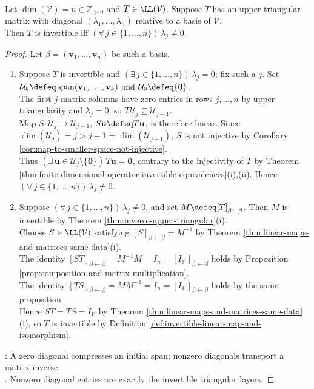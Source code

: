 \begin{proposition} \label{prop:upper-triangular-invertibility-criterion} \\
Let $\dim(\mathcal{V})=n\in\mathbb{Z}_{>0}$ and $T\in\LL(\mathcal{V})$. Suppose $T$ has an upper-triangular matrix with diagonal $(\lambda_1,\ldots,\lambda_n)$ relative to a basis of $\mathcal{V}$.\\
Then $T$ is invertible iff $(\forall\,j\in\{1,\ldots,n\})\,\lambda_j\neq0$.
\begin{proof}
Let $\beta=(\mathbf{v}_1,\ldots,\mathbf{v}_n)$ be such a basis.
\begin{enumerate}[label=\roman*.]
\setlength{\itemsep}{0pt}
\item[$(\Rightarrow)$] Suppose $T$ is invertible and $(\exists\,j\in\{1,\ldots,n\})\,\lambda_j=0$; fix such a $j$. Set $\mathcal{U}_k\defeq\operatorname{span}(\mathbf{v}_1,\ldots,\mathbf{v}_k)$ and $\mathcal{U}_0\defeq\{\mathbf{0}\}$.\\
The first $j$ matrix columns have zero entries in rows $j,\ldots,n$ by upper triangularity and $\lambda_j=0$, so $T\mathcal{U}_j\subseteq\mathcal{U}_{j-1}$.\\
Map $S:\mathcal{U}_j\to\mathcal{U}_{j-1}$, $S\mathbf{u}\defeq T\mathbf{u}$, is therefore linear. Since $\dim(\mathcal{U}_j)=j>j-1=\dim(\mathcal{U}_{j-1})$, $S$ is not injective by Corollary \ref{cor:map-to-smaller-space-not-injective}.\\
Thus $(\exists\,\mathbf{u}\in\mathcal{U}_j\setminus\{\mathbf{0}\})\,T\mathbf{u}=\mathbf{0}$, contrary to the injectivity of $T$ by Theorem \ref{thm:finite-dimensional-operator-invertible-equivalences}(i),(ii). Hence $(\forall\,j\in\{1,\ldots,n\})\,\lambda_j\neq0$.
\item[$(\Leftarrow)$] Suppose $(\forall\,j\in\{1,\ldots,n\})\,\lambda_j\neq0$, and set $M\defeq[T]_{\beta\leftarrow\beta}$. Then $M$ is invertible by Theorem \ref{thm:inverse-upper-triangular}(i).\\
Choose $S\in\LL(\mathcal{V})$ satisfying $[S]_{\beta\leftarrow\beta}=M^{-1}$ by Theorem \ref{thm:linear-maps-and-matrices-same-data}(i).\\
The identity $[ST]_{\beta\leftarrow\beta}=M^{-1}M=I_n=[I_{\mathcal{V}}]_{\beta\leftarrow\beta}$ holds by Proposition \ref{prop:composition-and-matrix-multiplication}.\\
The identity $[TS]_{\beta\leftarrow\beta}=MM^{-1}=I_n=[I_{\mathcal{V}}]_{\beta\leftarrow\beta}$ holds by the same proposition.\\
Hence $ST=TS=I_{\mathcal{V}}$ by Theorem \ref{thm:linear-maps-and-matrices-same-data}(i), so $T$ is invertible by Definition \ref{def:invertible-linear-map-and-isomorphism}.
\end{enumerate}
: A zero diagonal compresses an initial span; nonzero diagonals transport a matrix inverse.\\
: Nonzero diagonal entries are exactly the invertible triangular layers.
\end{proof}
\end{proposition}

